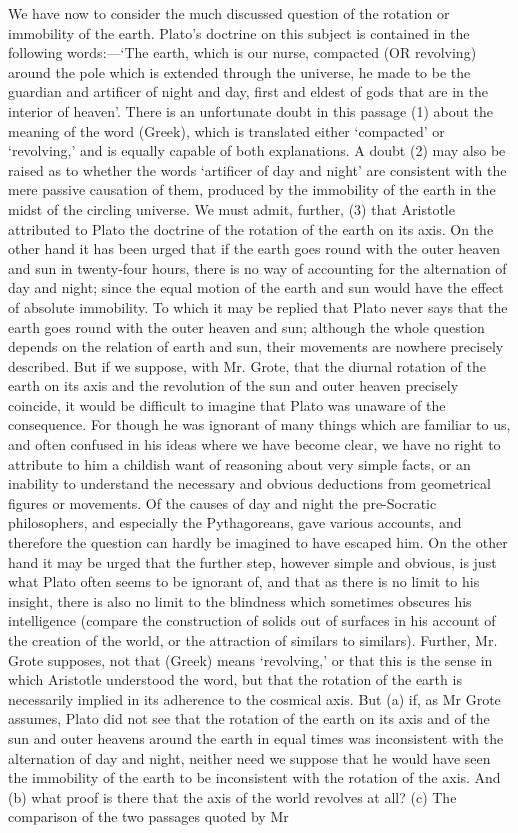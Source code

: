 \documentclass[11pt,letter]{article}
\begin{document}
\par  We have now to consider the much discussed question of the rotation or immobility of the earth. Plato’s doctrine on this subject is contained in the following words:—‘The earth, which is our nurse, compacted (OR revolving) around the pole which is extended through the universe, he made to be the guardian and artificer of night and day, first and eldest of gods that are in the interior of heaven’. There is an unfortunate doubt in this passage (1) about the meaning of the word (Greek), which is translated either ‘compacted’ or ‘revolving,’ and is equally capable of both explanations. A doubt (2) may also be raised as to whether the words ‘artificer of day and night’ are consistent with the mere passive causation of them, produced by the immobility of the earth in the midst of the circling universe. We must admit, further, (3) that Aristotle attributed to Plato the doctrine of the rotation of the earth on its axis. On the other hand it has been urged that if the earth goes round with the outer heaven and sun in twenty-four hours, there is no way of accounting for the alternation of day and night; since the equal motion of the earth and sun would have the effect of absolute immobility. To which it may be replied that Plato never says that the earth goes round with the outer heaven and sun; although the whole question depends on the relation of earth and sun, their movements are nowhere precisely described. But if we suppose, with Mr. Grote, that the diurnal rotation of the earth on its axis and the revolution of the sun and outer heaven precisely coincide, it would be difficult to imagine that Plato was unaware of the consequence. For though he was ignorant of many things which are familiar to us, and often confused in his ideas where we have become clear, we have no right to attribute to him a childish want of reasoning about very simple facts, or an inability to understand the necessary and obvious deductions from geometrical figures or movements. Of the causes of day and night the pre-Socratic philosophers, and especially the Pythagoreans, gave various accounts, and therefore the question can hardly be imagined to have escaped him. On the other hand it may be urged that the further step, however simple and obvious, is just what Plato often seems to be ignorant of, and that as there is no limit to his insight, there is also no limit to the blindness which sometimes obscures his intelligence (compare the construction of solids out of surfaces in his account of the creation of the world, or the attraction of similars to similars). Further, Mr. Grote supposes, not that (Greek) means ‘revolving,’ or that this is the sense in which Aristotle understood the word, but that the rotation of the earth is necessarily implied in its adherence to the cosmical axis. But (a) if, as Mr Grote assumes, Plato did not see that the rotation of the earth on its axis and of the sun and outer heavens around the earth in equal times was inconsistent with the alternation of day and night, neither need we suppose that he would have seen the immobility of the earth to be inconsistent with the rotation of the axis. And (b) what proof is there that the axis of the world revolves at all? (c) The comparison of the two passages quoted by Mr 
\end{document}
